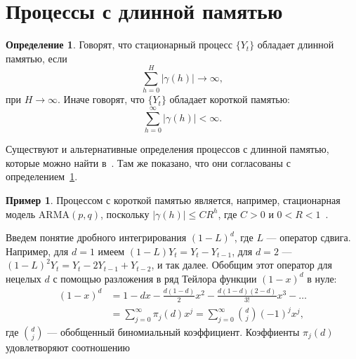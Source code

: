 \documentclass[specialist,
substylefile = spbu_report.rtx,
subf,href,colorlinks=true, 12pt]{disser}
\theoremstyle{definition}
\newtheorem{definition}{Определение}[section]
\newtheorem{example}{Пример}[section]
\begin{document}
\section{Процессы с длинной памятью}
\begin{definition}\label{def:longmemory}
	Говорят, что стационарный процесс $\{Y_t\}$ обладает длинной памятью, если
	\[
		\sum_{h=0}^H|\gamma(h)|\to\infty,
	\]
	при $H\to\infty$. Иначе говорят, что $\{Y_t\}$ обладает короткой памятью:
	\[
		\sum_{h=0}^\infty|\gamma(h)|<\infty.
	\]
\end{definition}
Существуют и альтернативные определения процессов с длинной памятью, которые можно найти в~\cite[Section 3.1]{Palma2006}. Там же показано, что они согласованы с определением~\ref{def:longmemory}.
\begin{example}
	Процессом с короткой памятью является, например, стационарная модель $\mathrm{ARMA}(p, q)$, поскольку $|\gamma(h)|\leqslant CR^h$, где $C>0$ и $0<R<1$~\cite{BoxJenkins2016}.
\end{example}
Введем понятие дробного интегрирования $(1-L)^d$, где $L$ --- оператор сдвига. Например, для $d=1$ имеем $(1-L)Y_t=Y_t-Y_{t-1}$, для $d=2$ --- $(1-L)^2Y_t=Y_t-2Y_{t-1}+Y_{t-2}$, и так далее. Обобщим этот оператор для нецелых $d$ с помощью разложения в ряд Тейлора функции $(1-x)^d$ в нуле:
\[
	\begin{aligned}
		(1-x)^d & =1-dx-\frac{d(1-d)}{2}x^2-\frac{d(1-d)(2-d)}{3!}x^3-\ldots             \\
		        & =\sum_{j=0}^\infty \pi_j(d)x^j=\sum_{j=0}^\infty\binom{d}{j}(-1)^jx^j,
	\end{aligned}
\]
где $\binom{d}{j}$ --- обобщенный биномиальный коэффициент. Коэффиенты $\pi_j(d)$ удовлетворяют соотношению
\end{document}
